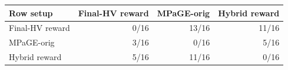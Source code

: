 \begin{tabular}{lrrr}
\toprule
Row setup & Final-HV reward & MPaGE-orig & Hybrid reward \\
\midrule
Final-HV reward & 0/16 & 13/16 & 11/16 \\
MPaGE-orig & 3/16 & 0/16 & 5/16 \\
Hybrid reward & 5/16 & 11/16 & 0/16 \\
\bottomrule
\end{tabular}
